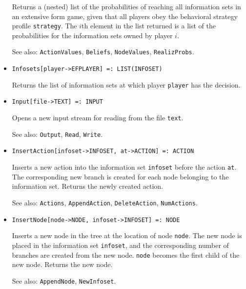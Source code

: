 \begin{itemize}
\bd
Returns a (nested) list of the probabilities of reaching all information
sets in an extensive form game, given that all players obey the
behavioral strategy profile \verb+strategy+.  The $i$th element
in the list returned is a list of the probabilities for the information
sets owned by player $i$.
\item
[See also:] {\tt ActionValues}, {\tt Beliefs}, {\tt NodeValues},
{\tt RealizProbs}.
\ed

\item
\protect \large \begin{verbatim}
Infosets[player->EFPLAYER] =: LIST(INFOSET)
\end{verbatim}\normalsize

\bd
Returns the list of information sets at which player
\verb+player+ has the decision.
\ed

\item
\protect \large \begin{verbatim}
Input[file->TEXT] =: INPUT
\end{verbatim}\normalsize

\bd
Opens a new input stream for reading from the file \verb+text+.
\item
[See also:]  {\tt Output}, {\tt Read}, {\tt Write}.
\ed

\item
\protect \large \begin{verbatim}
InsertAction[infoset->INFOSET, at->ACTION] =: ACTION
\end{verbatim}\normalsize

\bd
Inserts a new action into the information set \verb+infoset+
before the action \verb+at+.  The corresponding new branch is created for
each node belonging to the information set.  Returns the newly created action.
\item
[See also:] {\tt Actions}, {\tt AppendAction}, {\tt DeleteAction},
{\tt NumActions}.
\ed

\item
\protect \large \begin{verbatim}
InsertNode[node->NODE, infoset->INFOSET] =: NODE
\end{verbatim}\normalsize

\bd
Inserts a new node in the tree at the location of
node \verb+node+.  The
new node is placed in the information set \verb+infoset+, and the
corresponding number of branches are created from the new node.  \verb+node+
becomes the first child of the new node.  Returns the new node.
\item
[See also:] {\tt AppendNode}, {\tt NewInfoset}.
\ed


\end{itemize}

